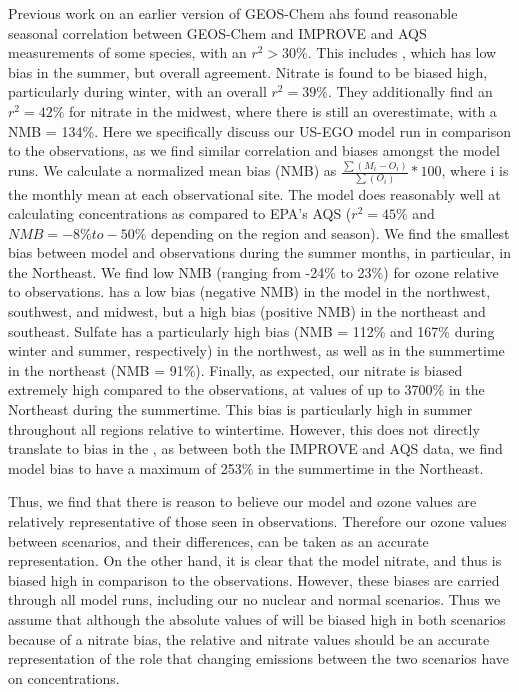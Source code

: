 \documentclass[12]{article}
\begin{document}
Previous work \citep{holt_changes_2015} on an earlier version of GEOS-Chem ahs found reasonable seasonal correlation between GEOS-Chem and IMPROVE and AQS measurements of some species, with an $r^2 > 30\%$. This includes , which has low bias in the summer, but overall agreement. Nitrate is found to be biased high, particularly during winter, with an overall $r^2 = 39\%$. They additionally find an $r^2 = 42\%$ for nitrate in the midwest, where there is still an overestimate, with a NMB = 134\%. Here we specifically discuss our US-EGO model run in comparison to the observations, as we find similar correlation and biases amongst the model runs. We calculate a normalized mean bias (NMB) as $\frac{\sum(M_i - O_i)}{\sum(O_i)}*100$, where i is the monthly mean at each observational site. The model does reasonably well at calculating  concentrations as compared to EPA's AQS ($r^2 = 45\%$ and $NMB = -8\% to -50\%$ depending on the region and season). We find the smallest bias between model  and observations during the summer months, in particular, in the Northeast.
We find low NMB (ranging from -24\% to 23\%) for ozone relative to observations.  has a low bias (negative NMB) in the model in the northwest, southwest, and midwest, but a high bias (positive NMB) in the northeast and southeast. Sulfate has a particularly high bias (NMB = 112\% and 167\% during winter and summer, respectively) in the northwest, as well as in the summertime in the northeast (NMB = 91\%). Finally, as expected, our nitrate is biased extremely high compared to the observations, at values of up to 3700\% in the Northeast during the summertime. This bias is particularly high in summer throughout all regions relative to wintertime. However, this does not directly translate to bias in the , as between both the IMPROVE and AQS data, we find model bias to have a maximum of 253\% in the summertime in the Northeast. 

Thus, we find that there is reason to believe our model  and ozone values are relatively representative of those seen in observations. Therefore our ozone values between scenarios, and their differences, can be taken as an accurate representation. On the other hand, it is clear that the model nitrate, and thus  is biased high in comparison to the observations. However, these biases are carried through all model runs, including our no nuclear and normal scenarios. Thus we assume that although the absolute values of  will be biased high in both scenarios because of a nitrate bias, the relative  and nitrate values should be an accurate representation of the role that changing emissions between the two scenarios have on  concentrations.
\end{document}
